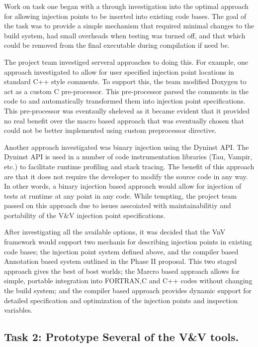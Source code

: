 Work on task one began with a through investigation into the optimal approach for allowing injection points to be inserted 
into existing code bases. The goal of the task was to provide a simple mechanism that required minimal changes to the build system, had small
overheads when testing was turned off, and that which could be removed from the final executable during compilation if need be. 

The project team investiged serveral approaches to doing this. For example, one approach investigated to allow for user specified injection point locations in standard 
C++ style comments. To support this, the team modified Doxygen to act as a custom C pre-processor. This pre-processor parsed the comments in the code to
and automatically transformed them into injection point specifications. This pre-processor was eventaully sheleved as it became evident that it provided
no real benefit over the macro based approach that was eventually chosen that could not be better implemented using custom preprocessor directive.

Another approach investigated was binary injection using the Dyninst API. The Dyninst API is used in a number of code instrumentation libraries (Tau, Vampir, etc.) to facilitate runtime profiling and stack tracing. The benefit of this approach are that it does not require the developer to modify the source code in any way. In other words, a binary injection based approach would allow for injection of tests at runtime at any point in any code. While tempting, the project team passed on this approach due to issues asscoiated with maintainabilitiy and portability of the V\&V injection point specifications. 

After investigating all the available options, it was decided that the VnV framework would support two mechanis for describing injection points in existing code bases; the injection point system defined above, and the compiler based Annotation based system outlined in the Phase II proposal. This two staged approach gives the best of bost worlds; the Marcro based approach allows for simple, portable integration into FORTRAN,C and C++ codes without changing the build system; and the compiler based approach provides dynamic support for detailed specification and optimization of the injection points and inspection variables. 

\subsection{Task 2: Prototype Several of the V&V tools.  }

